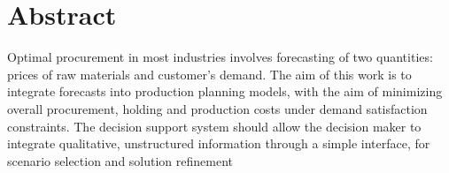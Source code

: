 
\chapter*{Abstract}

Optimal procurement in most industries involves forecasting of two
quantities: prices of raw materials and customer's demand.  The aim of
this work is to integrate forecasts into production planning models,
with the aim of minimizing overall procurement, holding and production
costs under demand satisfaction constraints.  The decision support
system should allow the decision maker to integrate qualitative,
unstructured information through a simple interface, for scenario
selection and solution refinement
